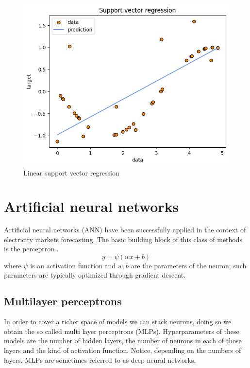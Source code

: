 \begin{figure}
    \includegraphics[width=\textwidth]{images/svr1.png}
    \caption{Linear support vector regression}
    \label{fig:svr1}
\end{figure}

\section{Artificial neural networks}
Artificial neural networks (ANN) have been successfully applied in the context of electricity markets forecasting. The basic building block of this class of methods is the perceptron \cite{rosenblatt1958perceptron}.
\begin{equation}
    y=\psi(wx+b)
\end{equation}
where $\psi$ is an activation function and $w,b$ are the parameters of the neuron; such parameters are typically optimized through gradient descent.

\subsection{Multilayer perceptrons}
In order to cover a richer space of models we can stack neurons, doing so we obtain the so called multi layer perceptrons (MLPs). Hyperparameters of these models are the number of hidden layers, the number of neurons in each of those layers and the kind of activation function.
Notice, depending on the numbers of layers, MLPs are sometimes referred to as deep neural networks.


